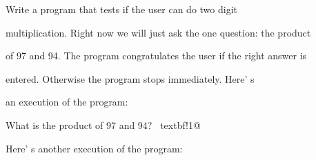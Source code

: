 Write a program that tests if the user can do two digit

multiplication. Right now we will just ask the one question: the product

of 97 and 94. The program congratulates the user if the right answer is

entered. Otherwise the program stops immediately. Here' s

an execution of the program:\\

\begin{console}[commandchars=\~\!\@]

What is the product of 97 and 94? ~textbf!1@

\end{console}

Here' s another execution of the program:\\


